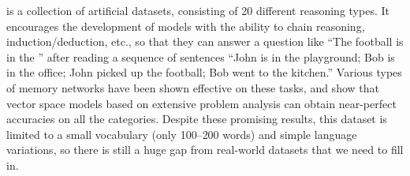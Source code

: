 \vspace{-0.1em}
 \cite{weston2016towards} is a collection of artificial datasets, consisting of 20 different reasoning types. It encourages the development of models with the ability to chain reasoning, induction\slash deduction, etc., so that they can answer a question like ``The football is in the '' after reading a sequence of sentences ``John is in the playground; Bob is in the office; John picked up the football; Bob went to the kitchen.'' Various types of memory networks \cite{sukhbaatar2015end,kumar2016ask} have been shown effective on these tasks, and  show that vector space models based on extensive problem analysis can obtain near-perfect accuracies on all the categories. Despite these promising results, this dataset is limited to a small vocabulary (only 100--200 words) and simple language variations, so there is still a huge gap from real-world datasets that we need to fill in.
